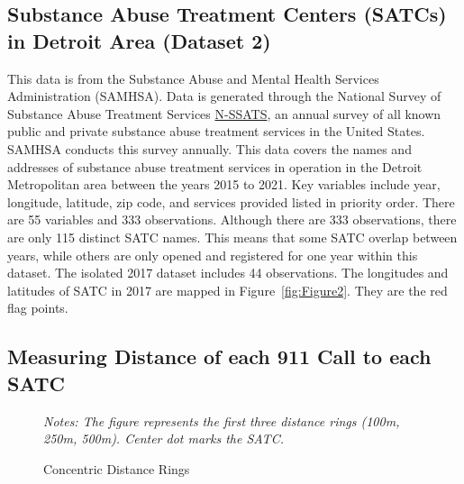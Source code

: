 \documentclass[12pt]{article}
\begin{document}
\subsection{Substance Abuse Treatment Centers (SATCs) in Detroit Area (Dataset 2)}

This data is from the Substance Abuse and Mental Health Services Administration (SAMHSA). Data is generated through the National Survey of Substance Abuse Treatment Services \href{https://www.samhsa.gov/data/data-we-collect/n-ssats-national-survey-substance-abuse-treatment-services}{N-SSATS}, an annual survey of all known public and private substance abuse treatment services in the United States. SAMHSA conducts this survey annually.  This data covers the names and addresses of substance abuse treatment services in operation in the Detroit Metropolitan area between the years 2015 to 2021. Key variables include year, longitude, latitude, zip code, and services provided listed in priority order. There are 55 variables and 333 observations.\footnotemark[1] Although there are 333 observations, there are only 115 distinct SATC names. This means that some SATC overlap between years, while others are only opened and registered for one year within this dataset. The isolated 2017 dataset includes 44 observations. The longitudes and latitudes of SATC in 2017 are mapped in Figure~\ref{fig:Figure2}. They are the red flag points. 


\subsection{Measuring Distance of each 911 Call to each SATC}
 


\begin{figure} 
\caption{Concentric Distance Rings}
\label{fig:Figure1}
\small\textit{Notes: The figure represents the first three distance rings (100m, 250m, 500m). Center dot marks the SATC.}
\end{figure}
\end{document}
